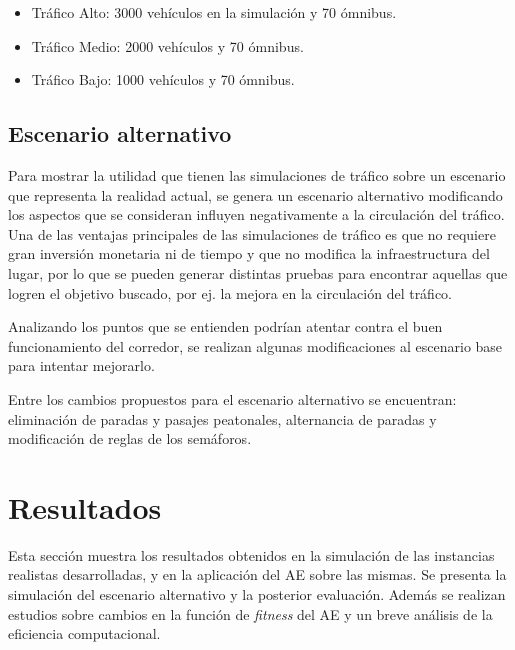 \begin{itemize}
\item Tráfico Alto:  3000 vehículos en la simulación y 70 ómnibus. 
\item Tráfico Medio: 2000 vehículos y 70 ómnibus.
\item Tráfico Bajo:  1000 vehículos y 70 ómnibus.
\end{itemize}

 

\subsection{Escenario alternativo}

Para mostrar la utilidad que tienen las simulaciones de tráfico sobre un escenario que representa la realidad actual, se genera un escenario alternativo modificando los aspectos que se consideran influyen negativamente a la circulación del tráfico. Una de las ventajas principales de las simulaciones de tráfico es que no requiere gran inversión monetaria ni de tiempo y que no modifica la infraestructura del lugar, por lo que se pueden generar distintas pruebas para encontrar aquellas que logren el objetivo buscado, por ej. la mejora en la circulación del tráfico.

Analizando los puntos que se entienden podrían atentar contra el buen funcionamiento del corredor, se realizan algunas modificaciones al escenario base para intentar mejorarlo. 

Entre los cambios propuestos para el escenario alternativo se encuentran: eliminación de paradas y pasajes peatonales, alternancia de paradas y modificación de reglas de los semáforos.



\section{Resultados}
Esta sección muestra los resultados obtenidos en la simulación de las instancias realistas desarrolladas, y en la aplicación del AE sobre las mismas. Se presenta la simulación del escenario alternativo y la posterior evaluación. Además se realizan estudios sobre cambios en la función de \emph{fitness} del AE y un breve análisis de la eficiencia computacional.


